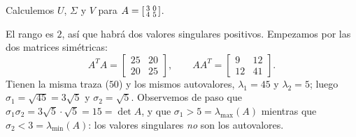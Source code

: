 \begin{example}\label{ej:svd-completo}
Calculemos $U$, $\Sigma$ y $V$ para
$A=\begin{bsmallmatrix}3&0\\ 4&5\end{bsmallmatrix}$.

El rango es $2$, así que habrá dos valores singulares positivos. Empezamos por
las dos matrices simétricas:
\[
A^TA=\begin{bmatrix}25&20\\ 20&25\end{bmatrix},
\qquad
AA^T=\begin{bmatrix}9&12\\ 12&41\end{bmatrix} .
\]
Tienen la misma traza ($50$) y los mismos autovalores, $\lambda_1=45$ y
$\lambda_2=5$; luego $\sigma_1=\sqrt{45}=3\sqrt5$ y $\sigma_2=\sqrt5$.
Observemos de paso que $\sigma_1\sigma_2=3\sqrt5\cdot\sqrt5=15=\det A$, y que
$\sigma_1>5=\lambda_{\max}(A)$ mientras que $\sigma_2<3=\lambda_{\min}(A)$:
los valores singulares \emph{no} son los autovalores.


\end{example}
